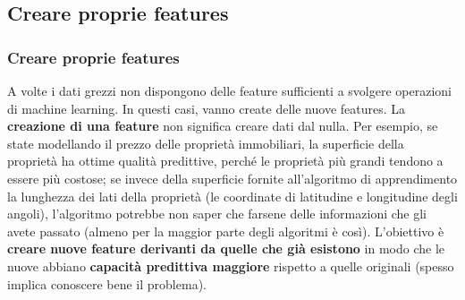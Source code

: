 \subsection[Creare proprie features]{Creare proprie features}

\begin{frame}
	
	\frametitle{{\color{GradientDescentDiagramRed}Creare proprie features}}

		A volte i dati grezzi non dispongono delle feature sufficienti a svolgere operazioni di machine learning. In questi casi, vanno create delle nuove features. La \textbf{creazione di una feature} non significa creare dati dal nulla.
		\newlinedouble
		Per esempio, se state modellando il prezzo delle proprietà immobiliari, la superficie della proprietà ha ottime qualità predittive, perché le proprietà più grandi tendono a essere più costose; se invece della superficie fornite all’algoritmo di apprendimento la lunghezza dei lati della proprietà (le coordinate di latitudine e longitudine degli angoli), l’algoritmo potrebbe non saper che farsene delle informazioni che gli avete passato (almeno per la maggior parte degli algoritmi è così).
		\newlinedouble
		L'obiettivo è \textbf{creare nuove feature derivanti da quelle che già esistono} in modo che le nuove abbiano \textbf{capacità predittiva maggiore} rispetto a quelle originali (spesso implica conoscere bene il problema).
	
\end{frame}